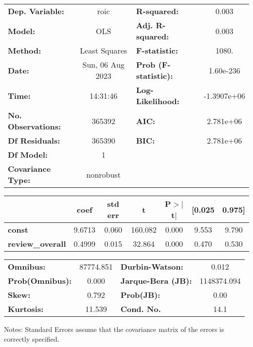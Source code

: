 \begin{center}
\begin{tabular}{lclc}
\toprule
\textbf{Dep. Variable:}    &       roic       & \textbf{  R-squared:         } &      0.003   \\
\textbf{Model:}            &       OLS        & \textbf{  Adj. R-squared:    } &      0.003   \\
\textbf{Method:}           &  Least Squares   & \textbf{  F-statistic:       } &      1080.   \\
\textbf{Date:}             & Sun, 06 Aug 2023 & \textbf{  Prob (F-statistic):} &  1.60e-236   \\
\textbf{Time:}             &     14:31:46     & \textbf{  Log-Likelihood:    } & -1.3907e+06  \\
\textbf{No. Observations:} &      365392      & \textbf{  AIC:               } &  2.781e+06   \\
\textbf{Df Residuals:}     &      365390      & \textbf{  BIC:               } &  2.781e+06   \\
\textbf{Df Model:}         &           1      & \textbf{                     } &              \\
\textbf{Covariance Type:}  &    nonrobust     & \textbf{                     } &              \\
\bottomrule
\end{tabular}
\begin{tabular}{lcccccc}
                         & \textbf{coef} & \textbf{std err} & \textbf{t} & \textbf{P$> |$t$|$} & \textbf{[0.025} & \textbf{0.975]}  \\
\midrule
\textbf{const}           &       9.6713  &        0.060     &   160.082  &         0.000        &        9.553    &        9.790     \\
\textbf{review\_overall} &       0.4999  &        0.015     &    32.864  &         0.000        &        0.470    &        0.530     \\
\bottomrule
\end{tabular}
\begin{tabular}{lclc}
\textbf{Omnibus:}       & 87774.851 & \textbf{  Durbin-Watson:     } &      0.012   \\
\textbf{Prob(Omnibus):} &    0.000  & \textbf{  Jarque-Bera (JB):  } & 1148374.094  \\
\textbf{Skew:}          &    0.792  & \textbf{  Prob(JB):          } &       0.00   \\
\textbf{Kurtosis:}      &   11.539  & \textbf{  Cond. No.          } &       14.1   \\
\bottomrule
\end{tabular}
\end{center}

Notes: \newline
 [1] Standard Errors assume that the covariance matrix of the errors is correctly specified.